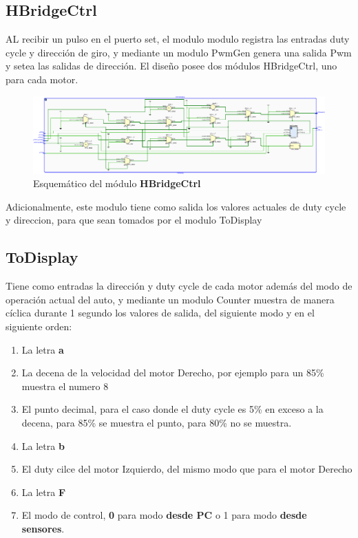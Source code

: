 \documentclass[12pt]{article}
\begin{document}
\subsection{HBridgeCtrl}
AL recibir un pulso en el puerto set, el modulo modulo registra las entradas duty cycle y dirección de giro, y mediante un modulo PwmGen genera una salida Pwm  y setea las salidas de dirección. El diseño posee dos módulos HBridgeCtrl, uno para cada motor.

\begin{figure}[H]
    \centering
    \includegraphics[width=\textwidth]{to-display-crop}
    \caption{Esquemático del módulo \textbf{HBridgeCtrl}}
\end{figure}

Adicionalmente, este modulo tiene como salida los valores actuales de duty cycle y direccion, para que sean tomados por el modulo ToDisplay

\subsection{ToDisplay}

Tiene como entradas la dirección y duty cycle de cada motor además del modo de operación actual del auto, y mediante un modulo Counter muestra de manera cíclica durante 1 segundo los valores de salida, del siguiente modo y en el siguiente orden:
\begin{enumerate}
\footnotesize
\item La letra \textbf{a}
\item La decena de la velocidad del motor Derecho, por ejemplo para un 85\% muestra el numero 8
\item El punto decimal, para el caso donde el duty cycle es 5\% en exceso a la decena, para 85\% se muestra el punto, para 80\% no se muestra.
\item La letra \textbf{b}
\item El duty cilce del motor Izquierdo, del mismo modo que para el motor Derecho
\item La letra \textbf{F}
\item El modo de control, \textbf{0} para modo \textbf{desde PC} o 1 para modo \textbf{desde sensores}.
\end{enumerate}
\end{document}
